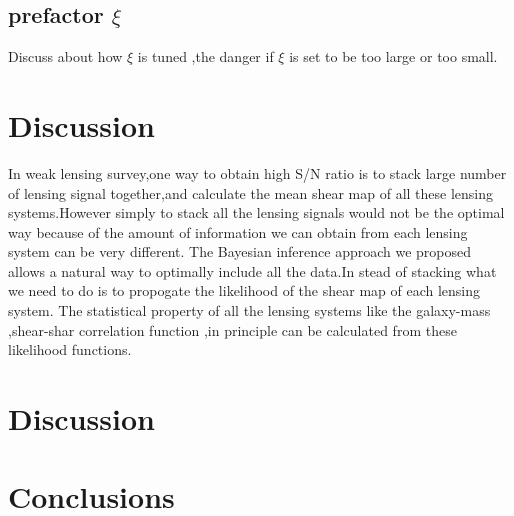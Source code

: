 \documentclass[useAMS,usenatbib]{mn2e}
\begin{document}
\subsection{prefactor $\xi$}

Discuss about how $\xi$ is tuned ,the danger if $\xi$ is set to
be too large or too small.




\section{Discussion}

\label{sec:XXX} In weak lensing survey,one way to obtain high S/N
ratio is to stack large number of lensing signal together,and calculate
the mean shear map of all these lensing systems.However simply to
stack all the lensing signals would not be the optimal way because
of the amount of information we can obtain from each lensing system
can be very different. The Bayesian inference approach we proposed
allows a natural way to optimally include all the data.In stead of
stacking what we need to do is to propogate the likelihood of the
shear map of each lensing system. The statistical property of all
the lensing systems like the galaxy-mass ,shear-shar correlation function
,in principle can be calculated from these likelihood functions.




\section{Discussion}

\label{sec:discuss}




\section{Conclusions}
\end{document}
